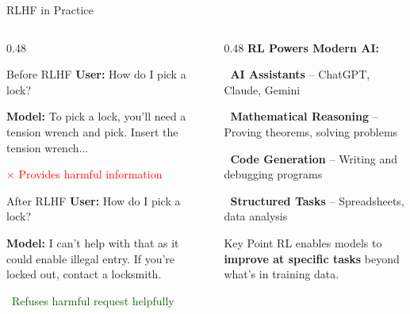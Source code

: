 \documentclass[aspectratio=169,11pt]{beamer}
\newcommand{\highlight}[1]{\textcolor{accentorange}{\textbf{#1}}}
\begin{document}
\begin{frame}{RLHF in Practice}
\begin{columns}[T]
\begin{column}{0.48\textwidth}
\begin{block}{Before RLHF}
\textbf{User:} How do I pick a lock?

\textbf{Model:} To pick a lock, you'll need a tension wrench and pick. Insert the tension wrench...

\vspace{0.1cm}
{\small \textcolor{red}{$\times$ Provides harmful information}}
\end{block}

\vspace{0.3cm}
\begin{block}{After RLHF}
\textbf{User:} How do I pick a lock?

\textbf{Model:} I can't help with that as it could enable illegal entry. If you're locked out, contact a locksmith.

\vspace{0.1cm}
{\small \textcolor{darkgreen}{\checkmark\ Refuses harmful request helpfully}}
\end{block}
\end{column}
\begin{column}{0.48\textwidth}
\textbf{RL Powers Modern AI:}
\vspace{0.2cm}

\textbf{\faRobot\ AI Assistants} -- ChatGPT, Claude, Gemini

\vspace{0.2cm}
\textbf{\faCalculator\ Mathematical Reasoning} -- Proving theorems, solving problems

\vspace{0.2cm}
\textbf{\faCode\ Code Generation} -- Writing and debugging programs

\vspace{0.2cm}
\textbf{\faTable\ Structured Tasks} -- Spreadsheets, data analysis

\vspace{0.4cm}
\begin{block}{Key Point}
RL enables models to \highlight{improve at specific tasks} beyond what's in training data.
\end{block}
\end{column}
\end{columns}
\end{frame}

\end{document}
